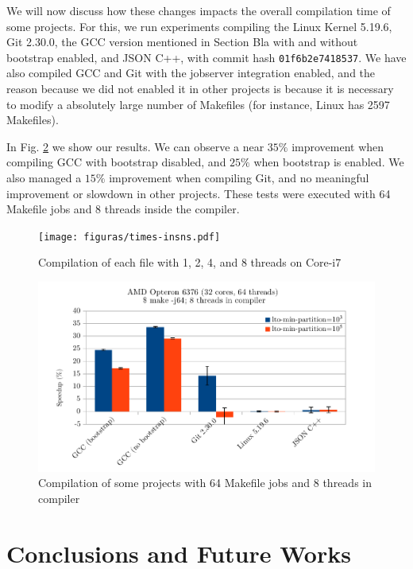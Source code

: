 \documentclass[runningheads]{llncs}
\begin{document}
We will now discuss how these changes impacts the overall compilation
time of some projects. For this, we run experiments compiling
the Linux Kernel 5.19.6, Git 2.30.0, the GCC version mentioned in
Section Bla with and without bootstrap enabled, and JSON C++, with
commit hash \texttt{01f6b2e7418537}. We have also compiled GCC and
Git with the jobserver integration enabled, and the reason because
we did not enabled it in other projects is because it is necessary
to modify a absolutely large number of Makefiles (for instance, Linux
has 2597 Makefiles). 

In Fig. \ref{fig:gcc_projects} we show our results. We can observe
a near $35\%$ improvement when compiling GCC with bootstrap disabled,
and $25\%$ when bootstrap is enabled. We also managed a $15\%$
improvement when compiling Git, and no meaningful improvement
or slowdown in other projects. These tests were executed with 64 Makefile
jobs and 8 threads inside the compiler.

\begin{figure}
\centering
	 \texttt{[image: figuras/times-insns.pdf]}
	  \caption{Compilation of each file with 1, 2, 4, and 8 threads on
	  Core-i7}
	  \label{fig:gcc_all_files}
\end{figure}

\begin{figure}
\centering
	 \includegraphics[scale=0.65]{figuras/experiment_projects.pdf}
	  \caption{Compilation of some projects with 64 Makefile jobs and 8 threads in compiler}
	  \label{fig:gcc_projects}
\end{figure}

\section{Conclusions and Future Works}\label{sec:future_works}
\end{document}
